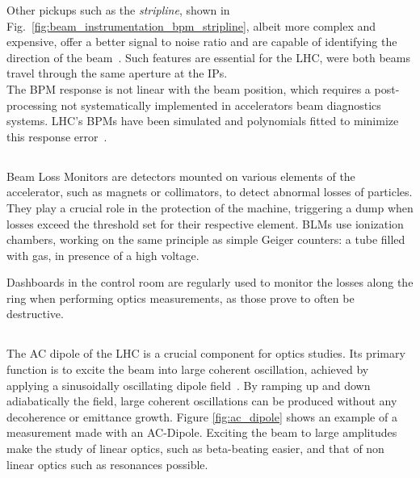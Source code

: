 Other pickups such as the \textit{stripline}, shown in
Fig.~\ref{fig:beam_instrumentation_bpm_stripline}, albeit more complex and expensive, offer a better
signal to noise ratio and are capable of identifying the direction of the
beam~\cite{wendt_bpm_2020}. Such features are essential for the LHC, were both beams travel through
the same aperture at the IPs.\\ 
The BPM response is not linear with the beam position, which requires a post-processing not
systematically implemented in accelerators beam diagnostics systems. LHC's BPMs have been simulated
and polynomials fitted to minimize this response error~\cite{a_nosych_geometrical_2014}.


 
\subsection{}


\subsection{}

Beam Loss Monitors are detectors mounted on various elements of the accelerator, such as magnets or
collimators, to detect abnormal losses of particles. They play a crucial role in the protection of
the machine, triggering a dump when losses exceed the threshold set for their respective element. 
BLMs use ionization chambers, working on the same principle as simple Geiger counters: a tube filled
with gas, in presence of a high voltage.

Dashboards in the control room are regularly used to monitor the losses along the ring when
performing optics measurements, as those prove to often be destructive.

\subsection{}

The AC dipole of the LHC is a crucial component for optics studies. Its primary function is to
excite the beam into large coherent oscillation, achieved by applying a sinusoidally oscillating
dipole field~\cite{miyamoto_parametrization_2008}. By ramping up and down adiabatically the field,
large coherent oscillations can be produced without any decoherence or emittance growth. Figure
\ref{fig:ac_dipole} shows an example of a measurement made with an AC-Dipole.  Exciting the beam to
large amplitudes make the study of linear optics, such as beta-beating easier, and that of non
linear optics such as resonances possible.

